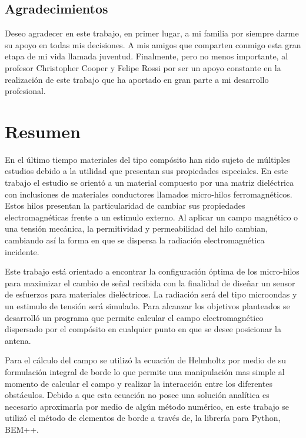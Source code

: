 \documentclass[12pt,letterpaper]{article}
\numberwithin{equation}{section}
\begin{document}
\begin{center}
	\section*{Agradecimientos}

	Deseo agradecer en este trabajo, en primer lugar, a mi familia por siempre darme su apoyo en todas mis decisiones. A mis amigos que comparten conmigo esta gran etapa de mi vida llamada juventud. Finalmente, pero no menos importante, al profesor Christopher Cooper y Felipe Rossi por ser un apoyo constante en la realización de este trabajo que ha aportado en gran parte a mi desarrollo profesional.

\end{center}


\pagebreak
\section*{Resumen}
En el último tiempo materiales del tipo compósito han sido sujeto de múltiples estudios debido a la utilidad que presentan sus propiedades especiales. En este trabajo el estudio se orientó a un material compuesto por una matriz dieléctrica con inclusiones de materiales conductores llamados micro-hilos ferromagnéticos. Estos hilos presentan la particularidad de cambiar sus propiedades electromagnéticas frente a un estimulo externo. Al aplicar un campo magnético o una tensión mecánica, la permitividad y permeabilidad del hilo cambian, cambiando así la forma en que se dispersa la radiación electromagnética incidente.

Este trabajo está orientado a encontrar la configuración óptima de los micro-hilos para maximizar el cambio de señal recibida con la finalidad de diseñar un sensor de esfuerzos para materiales dieléctricos. La radiación será del tipo microondas y un estimulo de tensión será simulado. Para alcanzar los objetivos planteados se desarrolló un programa que permite calcular el campo electromagnético dispersado por el compósito en cualquier punto en que se desee posicionar la antena.

Para el cálculo del campo se utilizó la ecuación de Helmholtz por medio de su formulación integral de borde lo que permite una manipulación mas simple al momento de calcular el campo y realizar la interacción entre los diferentes obstáculos. Debido a que esta ecuación no posee una solución analítica es necesario aproximarla por medio de algún método numérico, en este trabajo se utilizó el método de elementos de borde a través de, la librería para Python, BEM++.
\end{document}

